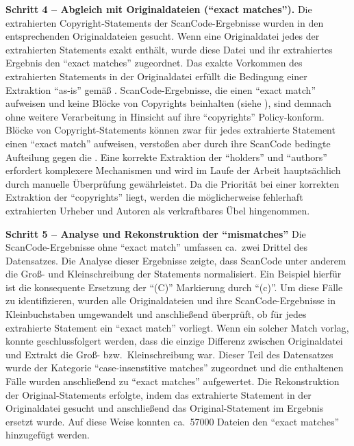 \textbf{Schritt 4 -- Abgleich mit Originaldateien (\enquote{exact matches}).}
Die extrahierten Copyright-Statements der ScanCode-Ergebnisse wurden in den entsprechenden Originaldateien gesucht.
Wenn eine Originaldatei jedes der extrahierten Statements exakt enthält, wurde diese Datei und ihr extrahiertes Ergebnis den \enquote{exact matches} zugeordnet.
Das exakte Vorkommen des extrahierten Statements in der Originaldatei erfüllt die Bedingung einer Extraktion \enquote{as-is} gemäß .
ScanCode-Ergebnisse, die einen \enquote{exact match} aufweisen und keine Blöcke von Copyrights beinhalten (siehe ), sind demnach ohne weitere Verarbeitung in Hinsicht auf ihre \enquote{copyrights} Policy-konform.
Blöcke von Copyright-Statements können zwar für jedes extrahierte Statement einen \enquote{exact match} aufweisen, verstoßen aber durch ihre ScanCode bedingte Aufteilung gegen die .
Eine korrekte Extraktion der \enquote{holders} und \enquote{authors} erfordert komplexere Mechanismen und wird im Laufe der Arbeit hauptsächlich durch manuelle Überprüfung gewährleistet.
Da die Priorität bei einer korrekten Extraktion der \enquote{copyrights} liegt, werden die möglicherweise fehlerhaft extrahierten Urheber und Autoren als verkraftbares Übel hingenommen.

\textbf{Schritt 5 -- Analyse und Rekonstruktion der \enquote{mismatches}}
Die ScanCode-Ergebnisse ohne \enquote{exact match} umfassen ca.\ zwei Drittel des Datensatzes.
Die Analyse dieser Ergebnisse zeigte, dass ScanCode unter anderem die Groß- und Kleinschreibung der Statements normalisiert.
Ein Beispiel hierfür ist die konsequente Ersetzung der \enquote{(C)} Markierung durch \enquote{(c)}.
Um diese Fälle zu identifizieren, wurden alle Originaldateien und ihre ScanCode-Ergebnisse in Kleinbuchstaben umgewandelt und anschließend überprüft, ob für jedes extrahierte Statement ein \enquote{exact match} vorliegt.
Wenn ein solcher Match vorlag, konnte geschlussfolgert werden, dass die einzige Differenz zwischen Originaldatei und Extrakt die Groß- bzw.\ Kleinschreibung war.
Dieser Teil des Datensatzes wurde der Kategorie \enquote{case-insenstitive matches} zugeordnet und die enthaltenen Fälle wurden anschließend zu \enquote{exact matches} aufgewertet.
Die Rekonstruktion der Original-Statements erfolgte, indem das extrahierte Statement in der Originaldatei gesucht und anschließend das Original-Statement im Ergebnis ersetzt wurde.
Auf diese Weise konnten ca.\ \num{57000} Dateien den \enquote{exact matches} hinzugefügt werden.

